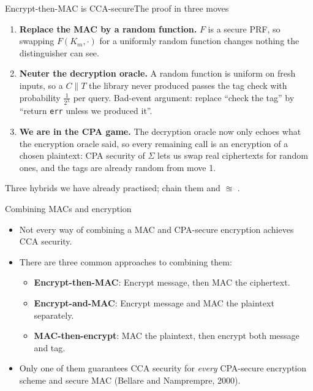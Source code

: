 \ifdefined\PRESENTATION\else\PassOptionsToClass{handout}{beamer}\fi\documentclass[aspectratio=169, lualatex]{beamer}
\begin{document}
\begin{frame}{Encrypt-then-MAC is CCA-secure}{The proof in three moves}
	\begin{enumerate}
		\item \textbf{Replace the MAC by a random function.} $F$ is a secure PRF, so swapping $F(K_m, \cdot)$ for a uniformly random function changes nothing the distinguisher can see.
		\item \textbf{Neuter the decryption oracle.} A random function is uniform on fresh inputs, so a $C\|T$ the library never produced passes the tag check with probability $\frac{1}{2^\lambda}$ per query. Bad-event argument: replace ``check the tag'' by ``return \texttt{err} unless we produced it''.
		\item \textbf{We are in the CPA game.} The decryption oracle now only echoes what the encryption oracle said, so every remaining call is an encryption of a chosen plaintext: CPA security of $\Sigma$ lets us swap real ciphertexts for random ones, and the tags are already random from move 1.
	\end{enumerate}
	\vspace{0.5em}
	Three hybrids we have already practised; chain them and  $\approxeq$ .
\end{frame}

\begin{frame}{Combining MACs and encryption}
	\begin{itemize}
		\item Not every way of combining a MAC and CPA-secure encryption achieves CCA security.
		\item There are three common approaches to combining them:
		      \begin{itemize}
			      \item \textbf{Encrypt-then-MAC}: Encrypt message, then MAC the ciphertext.
			      \item \textbf{Encrypt-and-MAC}: Encrypt message and MAC the plaintext separately.
			      \item \textbf{MAC-then-encrypt}: MAC the plaintext, then encrypt both message and tag.
		      \end{itemize}
		\item Only one of them guarantees CCA security for \emph{every} CPA-secure encryption scheme and secure MAC (Bellare and Namprempre, 2000).
	\end{itemize}
\end{frame}
\end{document}
